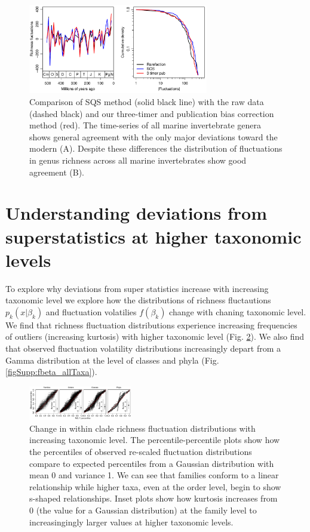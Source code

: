 \documentclass[12pt]{article}
\let\citep=\cite
\begin{document}
  
\begin{figure}[!hp]
  \centering
  \includegraphics[width=0.7\textwidth]{../../figSupp_divEstComp.pdf}
  \caption[Comparison of SQS method with the raw data and three-timer
  bias correction method]{Comparison of SQS method \citep{alroy2010}
    (solid black line) with the raw data (dashed black) and our
    three-timer and publication bias correction method (red). The
    time-series of all marine invertebrate genera shows general
    agreement with the only major deviations toward the modern
    (A). Despite these differences the distribution of fluctuations in
    genus richness across all marine invertebrates show good
    agreement (B).}
  \label{figSupp:3TPub}
\end{figure}


\section{Understanding deviations from superstatistics at higher
  taxonomic levels}
\label{sec:suppSstatTaxLevels}

To explore why deviations from super statistics increase with
increasing taxonomic level we explore how the distributions of
richness fluctautions $p_k(x | \beta_k)$ and fluctuation volatilies
$f(\beta_k)$ change with chaning taxonomic level. We find that
richness fluctuation distributions experience increasing frequencies
of outliers (increasing kurtosis) with higher taxonomic level
(Fig. \ref{figSupp:pkx_allTaxa}). We also find that observed
fluctuation volatility distributions increasingly depart from a Gamma
distribution at the level of classes and phyla
(Fig. \ref{figSupp:fbeta_allTaxa}).

\begin{figure}[!hp]
  \centering
  \includegraphics[width=0.4\textwidth]{../../figSupp_pkx_allTaxa.pdf}
  \caption{Change in within clade richness fluctuation distributions
    with increasing taxonomic level. The percentile-percentile plots
    show how the percentiles of observed re-scaled fluctuation
    distributions compare to expected percentiles from a Gaussian
    distribution with mean 0 and variance 1. We can see that families
    conform to a linear relationship while higher taxa, even at the
    order level, begin to show s-shaped relationships. Inset plots
    show how kurtosis increases from 0 (the value for a Gaussian
    distribution) at the family level to increasingingly larger values
    at higher taxonomic levels.}
  \label{figSupp:pkx_allTaxa}
\end{figure}
\end{document}
